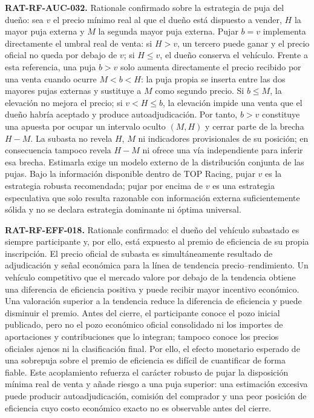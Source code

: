 \documentclass[10pt,letterpaper]{article}
\begin{document}
\noindent\textbf{RAT-RF-AUC-032.} Rationale confirmado sobre la estrategia de puja del dueño: sea $v$ el precio mínimo real al que el dueño está dispuesto a vender, $H$ la mayor puja externa y $M$ la segunda mayor puja externa. Pujar $b=v$ implementa directamente el umbral real de venta: si $H>v$, un tercero puede ganar y el precio oficial no queda por debajo de $v$; si $H\leq v$, el dueño conserva el vehículo. Frente a esta referencia, una puja $b>v$ solo aumenta directamente el precio recibido por una venta cuando ocurre $M<b<H$: la puja propia se inserta entre las dos mayores pujas externas y sustituye a $M$ como segundo precio. Si $b\leq M$, la elevación no mejora el precio; si $v<H\leq b$, la elevación impide una venta que el dueño habría aceptado y produce autoadjudicación. Por tanto, $b>v$ constituye una apuesta por ocupar un intervalo oculto $(M,H)$ y cerrar parte de la brecha $H-M$. La subasta no revela $H$, $M$ ni indicadores provisionales de su posición; en consecuencia tampoco revela $H-M$ ni ofrece una vía independiente para inferir esa brecha. Estimarla exige un modelo externo de la distribución conjunta de las pujas. Bajo la información disponible dentro de TOP Racing, pujar $v$ es la estrategia robusta recomendada; pujar por encima de $v$ es una estrategia especulativa que solo resulta razonable con información externa suficientemente sólida y no se declara estrategia dominante ni óptima universal.\par
\noindent\textbf{RAT-RF-EFF-018.} Rationale confirmado: el dueño del vehículo subastado es siempre participante y, por ello, está expuesto al premio de eficiencia de su propia inscripción. El precio oficial de subasta es simultáneamente resultado de adjudicación y señal económica para la línea de tendencia precio--rendimiento. Un vehículo competitivo que el mercado valore por debajo de la tendencia obtiene una diferencia de eficiencia positiva y puede recibir mayor incentivo económico. Una valoración superior a la tendencia reduce la diferencia de eficiencia y puede disminuir el premio. Antes del cierre, el participante conoce el pozo inicial publicado, pero no el pozo económico oficial consolidado ni los importes de aportaciones y contribuciones que lo integran; tampoco conoce los precios oficiales ajenos ni la clasificación final. Por ello, el efecto monetario esperado de una sobrepuja sobre el premio de eficiencia es difícil de cuantificar de forma fiable. Este acoplamiento refuerza el carácter robusto de pujar la disposición mínima real de venta y añade riesgo a una puja superior: una estimación excesiva puede producir autoadjudicación, comisión del comprador y una peor posición de eficiencia cuyo costo económico exacto no es observable antes del cierre.\par
\end{document}
